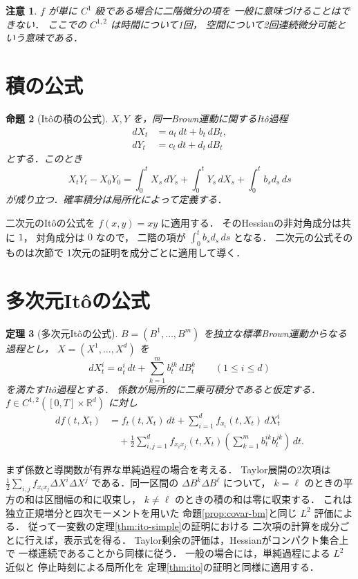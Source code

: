 \documentclass[a5paper,10pt,onecolumn]{jsarticle}
\makeatletter
\theoremstyle{mathnotetheorem}
\newtheorem{theorem}{定理}[section]
\newtheorem{proposition}[theorem]{命題}
\newtheorem{remark}[theorem]{注意}
\renewcommand{\proofname}{証明}
\renewenvironment{proof}[1][\proofname]{%
  \par\pushQED{\qed}\normalfont\topsep4\p@\@plus2\p@\relax
  \trivlist\item[\hskip\labelsep\bfseries #1]\ignorespaces
}{\popQED\endtrivlist\@endpefalse}
\makeatother
\begin{document}
\begin{remark}
$f$ が単に $C^1$ 級である場合に二階微分の項を
一般に意味づけることはできない．
ここでの $C^{1,2}$ は時間について1回，
空間について2回連続微分可能という意味である．
\end{remark}

\section{積の公式}

\begin{proposition}[It\^oの積の公式]\label{prop:product}
$X,Y$ を，同一Brown運動に関するIt\^o過程
\begin{align*}
 dX_t&=a_t\,dt+b_t\,dB_t,\\
 dY_t&=c_t\,dt+d_t\,dB_t
\end{align*}
とする．このとき
\[
 X_tY_t-X_0Y_0
 =\int_0^tX_s\,dY_s+\int_0^tY_s\,dX_s
   +\int_0^tb_sd_s\,ds
\]
が成り立つ．確率積分は局所化によって定義する．
\end{proposition}
\begin{proof}
二次元のIt\^oの公式を
$f(x,y)=xy$ に適用する．
そのHessianの非対角成分は共に $1$，
対角成分は $0$ なので，
二階の項が $\int_0^tb_sd_s\,ds$ となる．
二次元の公式そのものは次節で
1次元の証明を成分ごとに適用して導く．
\end{proof}

\section{多次元It\^oの公式}

\begin{theorem}[多次元It\^oの公式]\label{thm:multi}
$B=(B^1,\dots,B^m)$ を独立な標準Brown運動からなる過程とし，
$X=(X^1,\dots,X^d)$ を
\[
 dX^i_t=a^i_t\,dt+\sum_{k=1}^mb^{ik}_t\,dB^k_t
 \qquad(1\le i\le d)
\]
を満たすIt\^o過程とする．
係数が局所的に二乗可積分であると仮定する．
$f\in C^{1,2}([0,T]\times\mathbb R^d)$ に対し
\begin{align*}
 df(t,X_t)
 &=f_t(t,X_t)\,dt
   +\sum_{i=1}^df_{x_i}(t,X_t)\,dX^i_t\\
 &\quad+\frac12\sum_{i,j=1}^d
  f_{x_ix_j}(t,X_t)
  \left(\sum_{k=1}^mb^{ik}_tb^{jk}_t\right)\,dt.
\end{align*}
\end{theorem}
\begin{proof}
まず係数と導関数が有界な単純過程の場合を考える．
Taylor展開の2次項は
$\frac12\sum_{i,j}f_{x_ix_j}\Delta X^i\Delta X^j$
である．同一区間の
$\Delta B^k\Delta B^\ell$ について，
$k=\ell$ のときの平方の和は区間幅の和に収束し，
$k\ne\ell$ のときの積の和は零に収束する．
これは独立正規増分と四次モーメントを用いた
命題\ref{prop:covar-bm}と同じ $L^2$ 評価による．
従って一変数の定理\ref{thm:ito-simple}の証明における
二次項の計算を成分ごとに行えば，表示式を得る．
Taylor剰余の評価は，Hessianがコンパクト集合上で
一様連続であることから同様に従う．
一般の場合には，単純過程による $L^2$ 近似と
停止時刻による局所化を
定理\ref{thm:ito}の証明と同様に適用する．
\end{proof}
\end{document}

